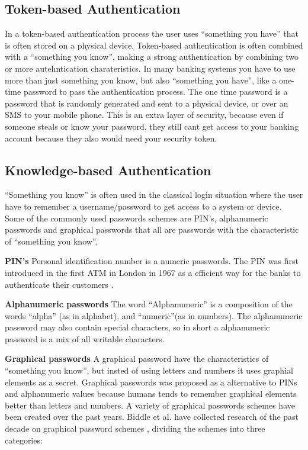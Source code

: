     \subsection{Token-based Authentication}
    In a token-based authentication process the user uses ``something you have'' that is often stored on a physical device. Token-based authentication is often combined with a ``something you know'', making a strong authentication by combining two or more autehntication charateristics. In many banking systems you have to use more than just something you know, but also ``something you have'', like a one-time password to pass the authentication process. The one time password is a password that is randomly generated and sent to a physical device, or over an SMS to your mobile phone. This is an extra layer of security, because even if someone steals or know your password, they still cant get access to your banking account because they also would need your security token.

    \subsection{Knowledge-based Authentication}
    ``Something you know'' is often used in the classical login situation where the user have to remember a username/password to get access to a system or device. Some of the commonly used passwords schemes are PIN's, alphanumeric passwords and graphical passwords that all are passwords with the characteristic of ``something you know''.

      {\bf PIN's} Personal identification number is a numeric passwords. The PIN was first introduced in the first ATM in London in 1967 as a efficient way for the banks to authenticate their customers \cite{Bonneau1}.      

      {\bf Alphanumeric passwords}
      The word ``Alphanumeric'' is a composition of the words ``alpha'' (as in alphabet), and ``numeric''(as in numbers). The alphanumeric password may also contain special characters, so in short a alphanumeric password is a mix of all writable characters.

      {\bf Graphical passwords}
      A graphical password have the characteristics of ``something you know'', but insted of using letters and numbers it uses graphial elements as a secret. Graphical passwords was proposed as a alternative to PINs and alphanumeric values because humans tends to remember graphical elements better than letters and numbers. A variety of graphical passwords schemes have been created over the past years. Biddle et al. have collected research of the past decade on graphical password schemes \cite{Biddle}, dividing the schemes into three categories: 

